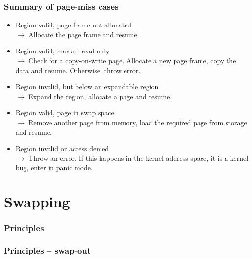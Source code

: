 
\begin{frame}
  \frametitle{Summary of page-miss cases}

  \begin{itemize}
  \item
  Region valid, page frame not allocated\\
  $\rightarrow$ Allocate the page frame and resume.
  \item
  Region valid, marked read-only\\
  $\rightarrow$ Check for a copy-on-write page. Allocate a new page
  frame, copy the data and resume. Otherwise, throw error.
  \item
  Region invalid, but below an expandable region\\
  $\rightarrow$ Expand the region, allocate a page and resume.
  \item
  Region valid, page in swap space\\
  $\rightarrow$ Remove another page from memory, load the required
  page from storage and resume.
  \item
  Region invalid or access denied\\
  $\rightarrow$ Throw an error. If this happens in the kernel address
  space, it is a kernel bug, enter in panic mode.
  \end{itemize}

\end{frame}

%
%

\section{Swapping}


\begin{frame}
  \frametitle{Principles}

  \begin{center}
  \end{center}

\end{frame}


\begin{frame}
  \frametitle{Principles -- swap-out}

  \begin{center}
  \end{center}

\end{frame}

